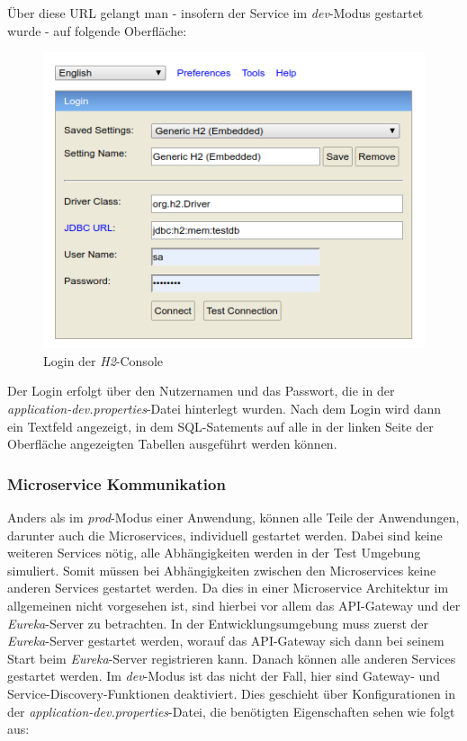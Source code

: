 Über diese \ac{URL} gelangt man - insofern der Service im \textit{dev}-Modus gestartet wurde - auf folgende Oberfläche:

\begin{figure}[H]
\centering
\includegraphics[width=\pictureWidth cm]{Bilder/Kapitel_5/h2_login.png}
\caption{Login der \textit{H2}-Console\label{fig:h2_login}}
\end{figure}

Der Login erfolgt über den Nutzernamen und das Passwort, die in der \textit{application-dev.properties}-Datei hinterlegt wurden. Nach dem Login wird dann ein Textfeld angezeigt, in dem \ac{SQL}-Satements auf alle in der linken Seite der Oberfläche angezeigten Tabellen ausgeführt werden können.

\subsubsection{Microservice Kommunikation}

Anders als im \textit{prod}-Modus einer Anwendung, können alle Teile der Anwendungen, darunter auch die Microservices, individuell gestartet werden. Dabei sind keine weiteren Services nötig, alle Abhängigkeiten werden in der Test Umgebung simuliert. Somit müssen bei Abhängigkeiten zwischen den Microservices keine anderen Services gestartet werden. Da dies in einer Microservice Architektur im allgemeinen nicht vorgesehen ist, sind hierbei vor allem das \ac{API}-Gateway und der \textit{Eureka}-Server zu betrachten. In der Entwicklungsumgebung muss zuerst der \textit{Eureka}-Server gestartet werden, worauf das \ac{API}-Gateway sich dann bei seinem Start beim \textit{Eureka}-Server registrieren kann. Danach können alle anderen Services gestartet werden. Im \textit{dev}-Modus ist das nicht der Fall, hier sind Gateway- und Service-Discovery-Funktionen deaktiviert. Dies geschieht über Konfigurationen in der \textit{application-dev.properties}-Datei, die benötigten Eigenschaften sehen wie folgt aus:

